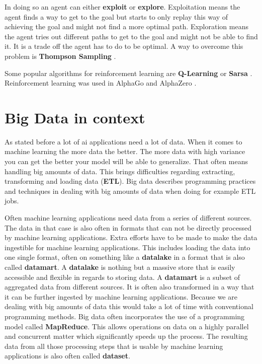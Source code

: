 \documentclass[jou,apacite]{apa6}
\begin{document}
In doing so an agent can either \textbf{exploit} or \textbf{explore}. Exploitation means the agent finds a way to get to the goal but starts to only replay this way of achieving the goal and might not find a more optimal path. Exploration means the agent tries out different paths to get to the goal and might not be able to find it. It is a trade off the agent has to do to be optimal. A way to overcome this problem is \textbf{Thompson Sampling} \cite{Chapelle2011}.

Some popular algorithms for reinforcement learning are \textbf{Q-Learning} \cite{Watkins1992} or \textbf{Sarsa} \cite{Berges1995}. Reinforcement learning was used in AlphaGo and AlphaZero \cite{silver2017}.

\section{Big Data in context}
As stated before a lot of \gls{ai} applications need a lot of data. When it comes to machine learning the more data the better. The more data with high variance you can get the better your model will be able to generalize. That often means handling big amounts of data. This brings difficulties regarding extracting, transforming and loading data (\textbf{ETL}). Big data describes programming practices and techniques in dealing with big amounts of data when doing for example ETL jobs.

Often machine learning applications need data from a series of different sources. The data in that case is also often in formats that can not be directly processed by machine learning applications. Extra efforts have to be made to make the data ingestible for machine learning applications. This includes loading the data into one single format, often on something like a \textbf{datalake} in a format that is also called \textbf{datamart}. A \textbf{datalake} is nothing but a massive store that is easily accessible and flexible in regards to storing data. A \textbf{datamart} is a subset of aggregated data from different sources. It is often also transformed in a way that it can be further ingested by machine learning applications. Because we are dealing with big amounts of data this would take a lot of time with conventional programming methods. Big data often incorporates the use of a programming model called \textbf{MapReduce}. This allows operations on data on a highly parallel and concurrent matter which significantly speeds up the process. The resulting data from all those processing steps that is usable by machine learning applications is also often called \textbf{dataset}.
\end{document}
